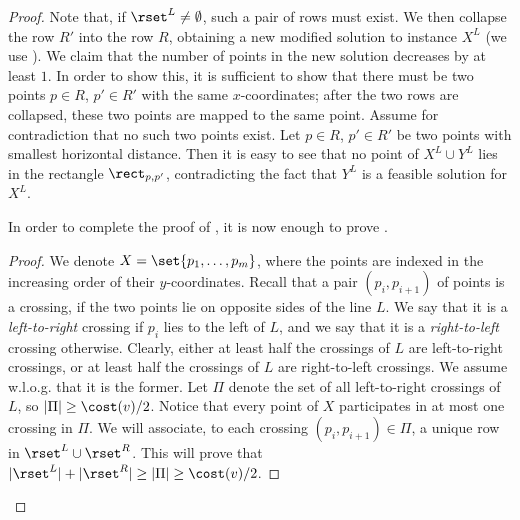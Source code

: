\documentclass{toc}
\begin{document}
\begin{proof}{}
Note that, if $\rset^L\neq\emptyset$, such a pair of rows must exist. We then collapse the row $R'$ into the row $R$, obtaining a new modified solution to instance $X^L$ (we use ). We claim that the number of points in the new solution decreases by at least $1$. In order to show this, it is sufficient to show that there must be two points $p\in R$, $p'\in R'$ with the same $x$-coordinates; after the two rows are collapsed, these two points are mapped to the same point. Assume for contradiction that no such two points exist. Let $p\in R$, $p'\in R'$ be two points with smallest horizontal distance. Then it is easy to see that no point of $X^L\cup Y^L$ lies in the rectangle $\rect_{p,p'}$, contradicting the fact that $Y^L$ is a feasible solution for $X^L$.

In order to complete the proof of , it is now enough to prove .

\begin{proof}{}
We denote $X=\set{p_1,\ldots,p_m}$, where the points are indexed in the increasing order of their $y$-coordinates. Recall that a pair $(p_i,p_{i+1})$ of points is a crossing, if the two points lie on opposite sides of the line $L$. We say that it is a \emph{left-to-right} crossing if $p_i$ lies to the left of $L$, and we say that it is a \emph{right-to-left} crossing otherwise. Clearly, either at least half the crossings of $L$ are left-to-right crossings, or at least half the crossings of $L$ are right-to-left crossings. We assume w.l.o.g. that it is the former. Let $\Pi$ denote the set of all left-to-right crossings of $L$, so $|\Pi|\geq \cost(v)/2$. Notice that every point of $X$ participates in at most one crossing in $\Pi$. We will associate, to each crossing $(p_i,p_{i+1})\in \Pi$, a unique row in $\rset^L\cup \rset^R$. This will prove that $|\rset^L|+|\rset^R|\geq |\Pi|\geq \cost(v)/2$.


\end{proof}
\end{proof}
\end{document}
